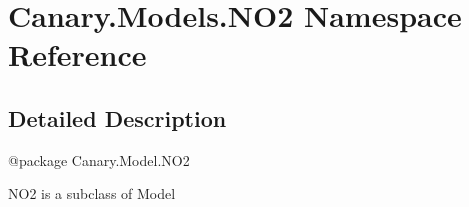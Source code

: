 \hypertarget{namespace_canary_1_1_models_1_1_n_o2}{\section{Canary.\-Models.\-N\-O2 Namespace Reference}
\label{namespace_canary_1_1_models_1_1_n_o2}
}


\subsection{Detailed Description}
\begin{DoxyVerb}@package Canary.Model.NO2

NO2 is a subclass of Model
\end{DoxyVerb}
 